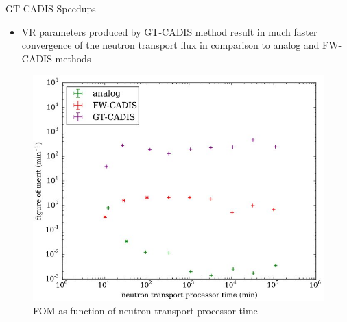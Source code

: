 \documentclass{beamer}
\begin{document}
\begin{frame}{GT-CADIS Speedups}
	\begin{itemize}
		\item{VR parameters produced by GT-CADIS method result in much
			faster convergence of the neutron transport flux in
			comparison to  analog and FW-CADIS methods}
	\end{itemize}
\begin{figure} 
	\includegraphics[scale=0.35]{gt_fom.jpg}
	\caption {FOM as function of neutron transport processor time}
\end{figure}

\end{frame}
\end{document}
